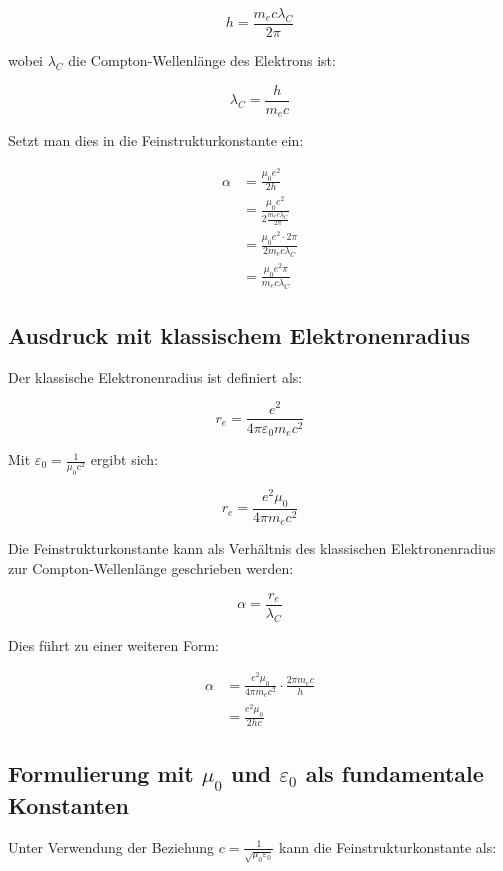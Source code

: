 \documentclass{article}
\begin{document}
	\begin{equation}
		h = \frac{m_e c \lambda_C}{2\pi}
	\end{equation}
	
	wobei $\lambda_C$ die Compton-Wellenlänge des Elektrons ist:
	
	\begin{equation}
		\lambda_C = \frac{h}{m_e c}
	\end{equation}
	
	Setzt man dies in die Feinstrukturkonstante ein:
	
	\begin{align}
		\alpha &= \frac{\mu_0e^2}{2h}\\
		&= \frac{\mu_0e^2}{2\frac{m_e c \lambda_C}{2\pi}}\\
		&= \frac{\mu_0e^2 \cdot 2\pi}{2m_e c \lambda_C}\\
		&= \frac{\mu_0e^2\pi}{m_e c \lambda_C}
	\end{align}
	
	\subsection{Ausdruck mit klassischem Elektronenradius}
	Der klassische Elektronenradius ist definiert als:
	
	\begin{equation}
		r_e = \frac{e^2}{4\pi\varepsilon_0 m_e c^2}
	\end{equation}
	
	Mit $\varepsilon_0 = \frac{1}{\mu_0c^2}$ ergibt sich:
	
	\begin{equation}
		r_e = \frac{e^2\mu_0}{4\pi m_e c^2}
	\end{equation}
	
	Die Feinstrukturkonstante kann als Verhältnis des klassischen Elektronenradius zur Compton-Wellenlänge geschrieben werden:
	
	\begin{equation}
		\alpha = \frac{r_e}{\lambda_C}
	\end{equation}
	
	Dies führt zu einer weiteren Form:
	
	\begin{align}
		\alpha &= \frac{e^2\mu_0}{4\pi m_e c^2} \cdot \frac{2\pi m_e c}{h}\\
		&= \frac{e^2\mu_0}{2hc}
	\end{align}
	
	\subsection{Formulierung mit $\mu_0$ und $\varepsilon_0$ als fundamentale Konstanten}
	Unter Verwendung der Beziehung $c = \frac{1}{\sqrt{\mu_0\varepsilon_0}}$ kann die Feinstrukturkonstante als:
	
\end{document}
